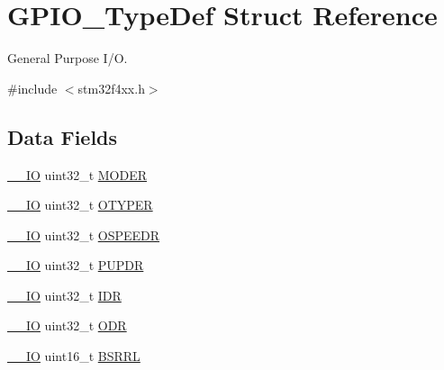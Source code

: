 \hypertarget{struct_g_p_i_o___type_def}{}\section{G\+P\+I\+O\+\_\+\+Type\+Def Struct Reference}
\label{struct_g_p_i_o___type_def}


General Purpose I/O.  




{\ttfamily \#include $<$stm32f4xx.\+h$>$}

\subsection*{Data Fields}
\begin{DoxyCompactItemize}
\item 
\hyperlink{group___c_m_s_i_s__core__definitions_gaec43007d9998a0a0e01faede4133d6be}{\+\_\+\+\_\+\+IO} uint32\+\_\+t \hyperlink{struct_g_p_i_o___type_def_a2b671a94c63a612f81e0e9de8152d01c}{M\+O\+D\+ER}
\item 
\hyperlink{group___c_m_s_i_s__core__definitions_gaec43007d9998a0a0e01faede4133d6be}{\+\_\+\+\_\+\+IO} uint32\+\_\+t \hyperlink{struct_g_p_i_o___type_def_a9543592bda60cb5261075594bdeedac9}{O\+T\+Y\+P\+ER}
\item 
\hyperlink{group___c_m_s_i_s__core__definitions_gaec43007d9998a0a0e01faede4133d6be}{\+\_\+\+\_\+\+IO} uint32\+\_\+t \hyperlink{struct_g_p_i_o___type_def_a328d16cc6213783ede54e4059ffd50a3}{O\+S\+P\+E\+E\+DR}
\item 
\hyperlink{group___c_m_s_i_s__core__definitions_gaec43007d9998a0a0e01faede4133d6be}{\+\_\+\+\_\+\+IO} uint32\+\_\+t \hyperlink{struct_g_p_i_o___type_def_abeed38529bd7b8de082e490e5d4f1727}{P\+U\+P\+DR}
\item 
\hyperlink{group___c_m_s_i_s__core__definitions_gaec43007d9998a0a0e01faede4133d6be}{\+\_\+\+\_\+\+IO} uint32\+\_\+t \hyperlink{struct_g_p_i_o___type_def_a328d2fe9ef1d513c3a97d30f98f0047c}{I\+DR}
\item 
\hyperlink{group___c_m_s_i_s__core__definitions_gaec43007d9998a0a0e01faede4133d6be}{\+\_\+\+\_\+\+IO} uint32\+\_\+t \hyperlink{struct_g_p_i_o___type_def_abff7fffd2b5a718715a130006590c75c}{O\+DR}
\item 
\hyperlink{group___c_m_s_i_s__core__definitions_gaec43007d9998a0a0e01faede4133d6be}{\+\_\+\+\_\+\+IO} uint16\+\_\+t \hyperlink{struct_g_p_i_o___type_def_aa79204c9bcc8c481da0a5ffe7c74d8b0}{B\+S\+R\+RL}
\item 

\end{DoxyCompactItemize}
